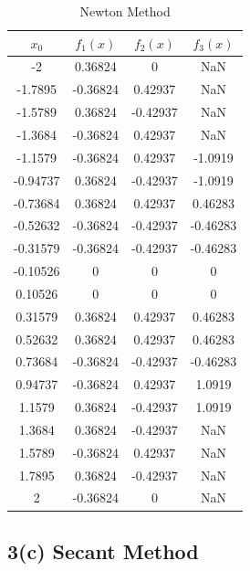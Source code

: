 \documentclass[11pt]{article}
\newcommand{\1}{\mathbbm{1}}
\begin{document}
	\begin{table}[h]
	\centering
	\begin{tabular}{c c c c  }
		\hline
		\hline
	     $x_{0}$   &   $f_{1}(x)$ &   $f_{2}(x)$ &   $f_{3}(x)$\\
	\hline
	-2  &   0.36824  &         0  &       NaN\\
	-1.7895  &  -0.36824  &   0.42937  &       NaN\\
	-1.5789  &   0.36824  &  -0.42937  &       NaN\\
	-1.3684  &  -0.36824  &   0.42937  &       NaN\\
	-1.1579  &  -0.36824  &   0.42937  &   -1.0919\\
	-0.94737  &   0.36824  &  -0.42937  &   -1.0919\\
	-0.73684  &   0.36824  &   0.42937  &   0.46283\\
	-0.52632  &  -0.36824  &  -0.42937  &  -0.46283\\
	-0.31579  &  -0.36824  &  -0.42937  &  -0.46283\\
	-0.10526  &         0  &         0  &         0\\
	0.10526  &         0  &         0  &         0\\
	0.31579  &   0.36824  &   0.42937  &   0.46283\\
	0.52632  &   0.36824  &   0.42937  &   0.46283\\
	0.73684  &  -0.36824  &  -0.42937  &  -0.46283\\
	0.94737  &  -0.36824  &   0.42937  &    1.0919\\
	1.1579  &   0.36824  &  -0.42937  &    1.0919\\
	1.3684  &   0.36824  &  -0.42937  &       NaN\\
	1.5789  &  -0.36824  &   0.42937  &       NaN\\
	1.7895  &   0.36824  &  -0.42937  &       NaN\\
	2  &  -0.36824  &         0  &       NaN\\
		\hline
		\hline
	\end{tabular} 
	\caption{Newton Method}
	\label{tab:3:2}
\end{table}

\subsection*{3(c) Secant Method}
\end{document}
